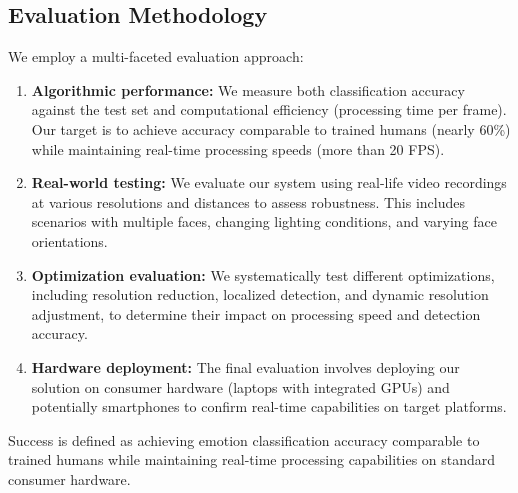 \subsection{Evaluation Methodology}
We employ a multi-faceted evaluation approach:

\begin{enumerate}
    \item \textbf{Algorithmic performance:} We measure both classification accuracy against the test set and computational efficiency (processing time per frame). Our target is to achieve accuracy comparable to trained humans (nearly 60\%) while maintaining real-time processing speeds (more than 20 FPS).
    
    \item \textbf{Real-world testing:} We evaluate our system using real-life video recordings at various resolutions and distances to assess robustness. This includes scenarios with multiple faces, changing lighting conditions, and varying face orientations.
    
    \item \textbf{Optimization evaluation:} We systematically test different optimizations, including resolution reduction, localized detection, and dynamic resolution adjustment, to determine their impact on processing speed and detection accuracy.
    
    \item \textbf{Hardware deployment:} The final evaluation involves deploying our solution on consumer hardware (laptops with integrated GPUs) and potentially smartphones to confirm real-time capabilities on target platforms.
\end{enumerate}

Success is defined as achieving emotion classification accuracy comparable to trained humans while maintaining real-time processing capabilities on standard consumer hardware.
